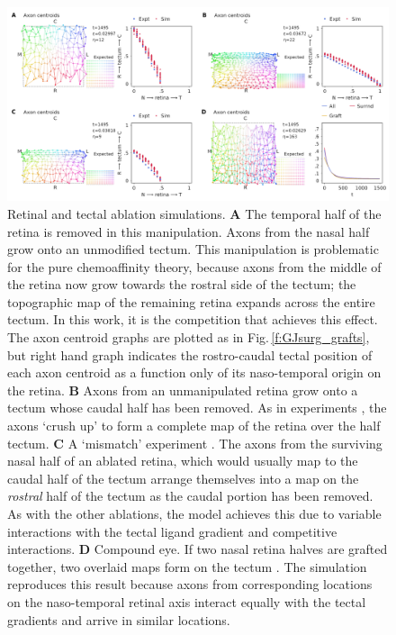 \documentclass[11pt, a4paper]{article}
\begin{document}
\begin{figure}
\includegraphics[width=\linewidth]{./images/fig_GJ_surgical_ablations.png}
\caption{Retinal and tectal ablation simulations. \textbf{A} The temporal half of the retina is removed in this manipulation. Axons from the nasal half grow onto an unmodified tectum. This manipulation is problematic for the pure chemoaffinity theory, because axons from the middle of the retina now grow towards the rostral side of the tectum; the topographic map of the remaining retina expands across the entire tectum. In this work, it is the competition that achieves this effect. The axon centroid graphs are plotted as in Fig.\,\ref{f:GJsurg_grafts}, but right hand graph indicates the rostro-caudal tectal position of each axon centroid as a function only of its naso-temporal origin on the retina. \textbf{B} Axons from an unmanipulated retina grow onto a tectum whose caudal half has been removed. As in experiments \citep{yoon_reorganization_1971,finlay_orderly_1979}, the axons `crush up' to form a complete map of the retina over the half tectum. \textbf{C} A `mismatch' experiment \citep{horder_retention_1971}. The axons from the surviving nasal half of an ablated retina, which would usually map to the caudal half of the tectum arrange themselves into a map on the \emph{rostral} half of the tectum as the caudal portion has been removed. As with the other ablations, the model achieves this due to variable interactions with the tectal ligand gradient and competitive interactions. \textbf{D} Compound eye. If two nasal retina halves are grafted together, two overlaid maps form on the tectum \citep{gaze_retino-tectal_1963}. The simulation reproduces this result because axons from corresponding locations on the naso-temporal retinal axis interact equally with the tectal gradients and arrive in similar locations.}
\label{f:GJsurg_ablate}
\end{figure}
\end{document}
